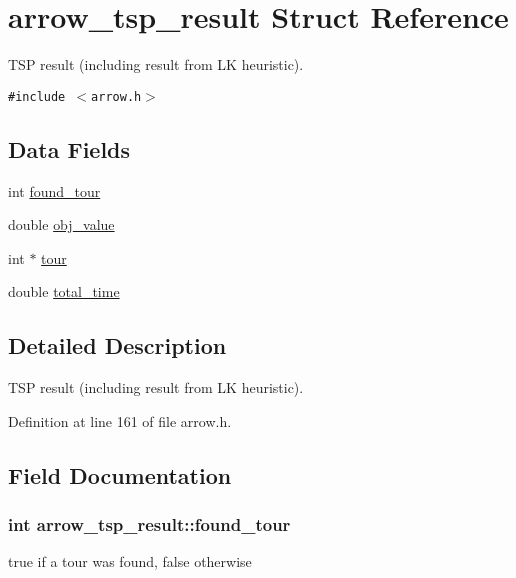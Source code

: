 \hypertarget{structarrow__tsp__result}{
\section{arrow\_\-tsp\_\-result Struct Reference}
\label{structarrow__tsp__result}
}
TSP result (including result from LK heuristic).  


{\tt \#include $<$arrow.h$>$}

\subsection*{Data Fields}
\begin{CompactItemize}
\item 
int \hyperlink{structarrow__tsp__result_b85143df6ecc70032db7411a1aa3192a}{found\_\-tour}
\item 
double \hyperlink{structarrow__tsp__result_f0fae9756e4c924517addf05988cfcb9}{obj\_\-value}
\item 
int $\ast$ \hyperlink{structarrow__tsp__result_48433b03146d6ca3423a555ea2139d52}{tour}
\item 
double \hyperlink{structarrow__tsp__result_82ea7aa0320d932892602d34339a9276}{total\_\-time}
\end{CompactItemize}


\subsection{Detailed Description}
TSP result (including result from LK heuristic). 

Definition at line 161 of file arrow.h.

\subsection{Field Documentation}
\hypertarget{structarrow__tsp__result_b85143df6ecc70032db7411a1aa3192a}{
\subsubsection{\setlength{\rightskip}{0pt plus 5cm}int {\bf arrow\_\-tsp\_\-result::found\_\-tour}}}
\label{structarrow__tsp__result_b85143df6ecc70032db7411a1aa3192a}


true if a tour was found, false otherwise 

